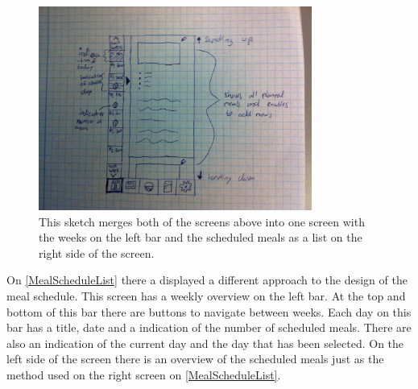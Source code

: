 \begin{figure}[H]
	\includegraphics[width=0.8\textwidth]{Grafik/FoodPlanner/FinalMealScheduleSketch2}
	\caption{This sketch merges both of the screens above into one screen with the weeks on the left bar and the scheduled meals as a list on the right side of the screen.}
	\label{MealScheduleBar}
\end{figure}

On \cref{MealScheduleList} there a displayed a different approach to the design of the meal schedule. This screen has a weekly overview on the left bar. At the top and bottom of this bar there are buttons to navigate between weeks. Each day on this bar has a title, date and a indication of the number of scheduled meals. There are also an indication of the current day and the day that has been selected. On  the left side of the screen there is an overview of the scheduled meals just as the method used on the right screen on \cref{MealScheduleList}. 

